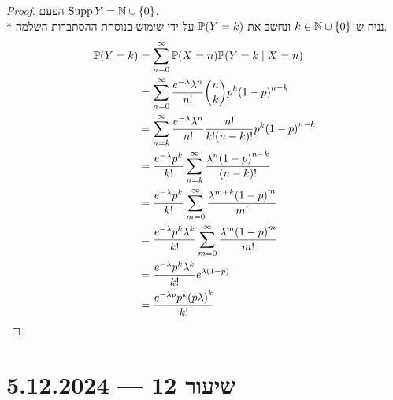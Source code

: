 \begin{proof}
	הפעם $\operatorname{Supp} Y = \mathbb{N} \cup \{0\}$. \\*
	נניח ש־$k \in \mathbb{N} \cup \{0\}$ ונחשב את $\mathbb{P}(Y = k)$ על־ידי שימוש בנוסחת ההסתברות השלמה.
	\begin{align*}
		\mathbb{P}(Y = k)
		& = \sum_{n = 0}^{\infty} \mathbb{P}(X = n) \mathbb{P}(Y = k \mid X = n) \\
		& = \sum_{n = 0}^{\infty} \frac{e^{-\lambda} \lambda^n}{n!} \binom{n}{k} p^k {(1 - p)}^{n - k} \\
		& = \sum_{n = k}^{\infty} \frac{e^{-\lambda} \lambda^n}{n!} \frac{n!}{k! (n - k)!} p^k {(1 - p)}^{n - k} \\
		& = \frac{e^{-\lambda} p^k}{k!} \sum_{n = k}^{\infty} \frac{\lambda^n {(1 - p)}^{n - k}}{(n - k)!} \\
		& = \frac{e^{-\lambda} p^k}{k!} \sum_{m = 0}^{\infty} \frac{\lambda^{m + k} {(1 - p)}^m}{m!} \\
		& = \frac{e^{-\lambda} p^k \lambda^k}{k!} \sum_{m = 0}^{\infty} \frac{\lambda^m {(1 - p)}^m}{m!} \\
		& = \frac{e^{-\lambda} p^k \lambda^k}{k!} e^{\lambda(1 - p)} \\
		& = \frac{e^{-\lambda p} p^k {(p \lambda)}^k}{k!}
	\end{align*}
\end{proof}

\section{שיעור 12 --- 5.12.2024}

